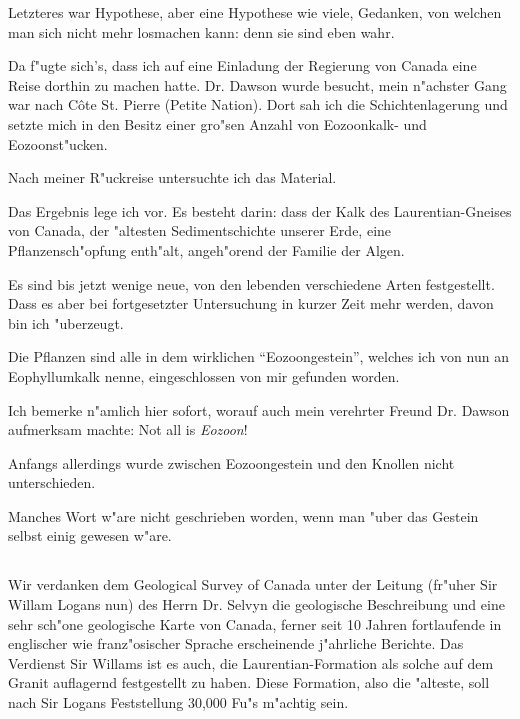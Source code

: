 \documentclass[a4paper, 11pt, oneside, german]{article}
\begin{document}
Letzteres war Hypothese, aber eine Hypothese wie viele, Gedanken, von welchen man sich nicht mehr losmachen kann: denn sie sind eben wahr.

Da f"ugte sich's, dass ich auf eine Einladung der Regierung von Canada eine Reise dorthin zu machen hatte. Dr. Dawson wurde besucht, mein n"achster Gang war nach Côte St. Pierre (Petite Nation). Dort sah ich die Schichtenlagerung und setzte mich in den Besitz einer gro"sen Anzahl von Eozoonkalk- und Eozoonst"ucken.

Nach meiner R"uckreise untersuchte ich das Material.

Das Ergebnis lege ich vor. Es besteht darin: dass der Kalk des Laurentian-Gneises von Canada, der "altesten Sedimentschichte unserer Erde, eine Pflanzensch"opfung enth"alt, angeh"orend der Familie der Algen.

Es sind bis jetzt wenige neue, von den lebenden verschiedene Arten festgestellt. Dass es aber bei fortgesetzter Untersuchung in kurzer Zeit mehr werden, davon bin ich "uberzeugt.

Die Pflanzen sind alle in dem wirklichen "`Eozoongestein"', welches ich von nun an Eophyllumkalk nenne, eingeschlossen von mir gefunden worden.

Ich bemerke n"amlich hier sofort, worauf auch mein verehrter Freund Dr. Dawson aufmerksam machte: Not all is \emph{Eozoon}!

Anfangs allerdings wurde zwischen Eozoongestein und den Knollen nicht unterschieden.

Manches Wort w"are nicht geschrieben worden, wenn man "uber das Gestein selbst einig gewesen w"are.
\clearpage
\subsection{}
\paragraph{}
Wir verdanken dem Geological Survey of Canada unter der Leitung (fr"uher Sir Willam Logans nun) des Herrn Dr. Selvyn die geologische Beschreibung und eine sehr sch"one geologische Karte von Canada, ferner seit 10 Jahren fortlaufende in englischer wie franz"osischer Sprache erscheinende j"ahrliche Berichte. Das Verdienst Sir Willams ist es auch, die Laurentian-Formation als solche auf dem Granit auflagernd festgestellt zu haben. Diese Formation, also die "alteste, soll nach Sir Logans Feststellung 30,000 Fu"s m"achtig sein.
\end{document}
